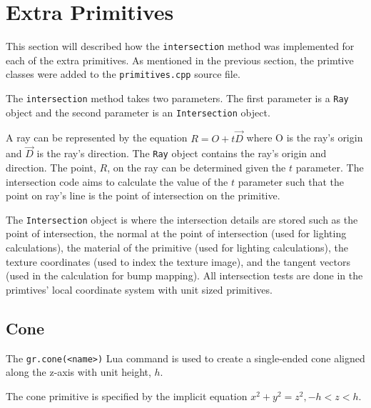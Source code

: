 \section{Extra Primitives}

This section will described how the \verb|intersection| method was
implemented for each of the extra primitives. As mentioned in the previous
section, the primtive classes were added to the \verb|primitives.cpp| source 
file.

The \verb|intersection| method takes two parameters. The first parameter is a
\verb|Ray| object and the second parameter is an \verb|Intersection| object. 

A ray can be represented by the equation $R = O + t\vec{D}$ where
O is the ray's origin and $\vec{D}$ is the ray's direction. The \verb|Ray| 
object contains the ray's origin and direction. The point, $R$, on the ray can 
be determined given the $t$ parameter. The intersection code aims to calculate 
the value of the $t$ parameter such that the point on ray's line is the point 
of intersection on the primitive. 

The \verb|Intersection| object is where the intersection details are
stored such as the point of intersection, the normal at the point of
intersection (used for lighting calculations), the material of the primitive
(used for lighting calculations), the texture coordinates (used to index the
texture image), and the tangent vectors (used in the calculation for bump
mapping). All intersection tests are done in the primtives' local coordinate
system with unit sized primitives.

\subsection*{Cone}
The \verb|gr.cone(<name>)| Lua command is used to create a single-ended cone 
aligned along the z-axis with unit height, $h$.

The cone primitive is specified by the implicit equation $x^2 + y^2 = z^2, -h <
z < h$.

